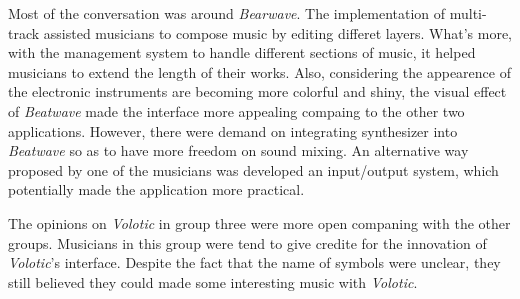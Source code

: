Most of the conversation was around \textit{Bearwave}. The implementation of multi-track assisted musicians to compose music by editing differet layers. What's more, with the management system to handle different sections of music, it helped musicians to extend the length of their works. Also, considering the appearence of the electronic instruments are becoming more colorful and shiny, the visual effect of \textit{Beatwave} made the interface more appealing compaing to the other two applications. However, there were demand on integrating synthesizer into \textit{Beatwave} so as to have more freedom on sound mixing. An alternative way proposed by one of the musicians was developed an input/output system, which potentially made the application more practical.

The opinions on \textit{Volotic} in group three were more open companing with the other groups. Musicians in this group were tend to give credite for the innovation of \textit{Volotic}'s interface. Despite the fact that the name of symbols were unclear, they still believed they could made some interesting music with \textit{Volotic}.
